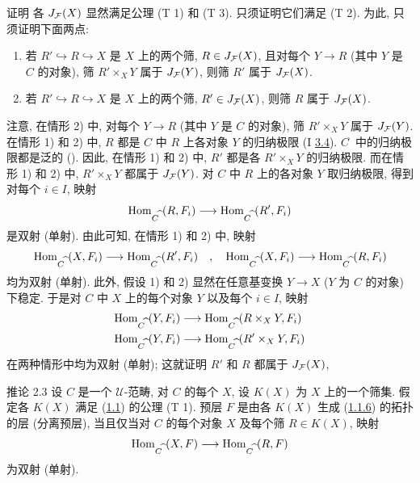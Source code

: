 \begin{enonce*}[remark]{证明}
各 $J_{{\mathcal F}}(X)$ 显然满足公理 (T 1) 和 (T 3).
只须证明它们满足 (T 2). 为此, 只须证明下面两点:
\begin{enumerate}
\renewcommand{\labelenumi}{\theenumi)}
\item 若 $R'\hookrightarrow R\hookrightarrow X$ 是 $X$ 上的两个筛,
$R\in J_{{\mathcal F}}(X)$, 且对每个 $Y\rightarrow R$
(其中 $Y$ 是 $C$ 的对象), 筛 $R'\times_X Y$ 属于 $J_{{\mathcal F}}(Y)$,
则筛 $R'$ 属于 $J_{{\mathcal F}}(X)$.

\item 若 $R'\hookrightarrow R\hookrightarrow X$ 是 $X$ 上的两个筛,
$R'\in J_{{\mathcal F}}(X)$, 则筛 $R$ 属于 $J_{{\mathcal F}}(X)$.
\end{enumerate}
\end{enonce*}

注意, 在情形 2) 中, 对每个 $Y\rightarrow R$
(其中 $Y$ 是 $C$ 的对象), 筛 $R'\times_X Y$ 属于 $J_{{\mathcal F}}(Y)$.
在情形 1) 和 2) 中, $R$ 都是 $C$ 中 $R$ 上各对象 $Y$ 的归纳极限
(I \hyperref[I.prop3.4]{3.4}).
$C^{\widehat{\phantom{,}}}$ 中的\pageoriginale{}归纳极限都是泛的
().
因此, 在情形 1) 和 2) 中, $R'$ 都是各 $R'\times_X Y$ 的归纳极限.
而在情形 1) 和 2) 中, $R'\times_X Y$ 都属于 $J_{{\mathcal F}}(Y)$.
对 $C$ 中 $R$ 上的各对象 $Y$ 取归纳极限, 得到对每个 $i\in I$, 映射
$$
\operatorname{Hom}_{C^{\widehat{\phantom{,}}}}(R,F_i)\longrightarrow
\operatorname{Hom}_{C^{\widehat{\phantom{,}}}}(R',F_i)
$$
是双射 (\resp 单射).
由此可知, 在情形 1) 和 2) 中, 映射
$$
\operatorname{Hom}_{C^{\widehat{\phantom{,}}}}(X,F_i)\longrightarrow
\operatorname{Hom}_{C^{\widehat{\phantom{,}}}}(R',F_i)\quad,\quad
\operatorname{Hom}_{C^{\widehat{\phantom{,}}}}(X,F_i)\longrightarrow
\operatorname{Hom}_{C^{\widehat{\phantom{,}}}}(R,F_i)
$$
均为双射 (\resp 单射).
此外, 假设 1) 和 2) 显然在任意基变换 $Y\rightarrow X$
($Y$ 为 $C$ 的对象) 下稳定.
于是对 $C$ 中 $X$ 上的每个对象 $Y$ 以及每个 $i\in I$, 映射
\begin{align*}
\operatorname{Hom}_{C^{\widehat{\phantom{,}}}}(Y,F_i)&\longrightarrow
\operatorname{Hom}_{C^{\widehat{\phantom{,}}}}(R\times_X Y, F_i)\\
\operatorname{Hom}_{C^{\widehat{\phantom{,}}}}(Y,F_i)&\longrightarrow
\operatorname{Hom}_{C^{\widehat{\phantom{,}}}}(R'\times_X Y, F_i)
\end{align*}
在两种情形中均为双射 (\resp 单射);
这就证明 $R'$ 和 $R$ 都属于 $J_{{\mathcal F}}(X)$, \cqfd

\begin{enonce*}{推论 2.3}
设 $C$ 是一个 $𝒰$-范畴,
对 $C$ 的每个 $X$, 设 $K(X)$ 为 $X$ 上的一个筛集.
假定各 $K(X)$ 满足 {\rm(\hyperref[II.def1.1]{1.1})} 的公理 {\rm (T 1)}.
预层 $F$ 是由各 $K(X)$ 生成
(\hyperref[II.subsubsec1.1.6]{1.1.6}) 的拓扑的层
(\resp 分离预层), 当且仅当对 $C$ 的每个对象 $X$
及每个筛 $R\in K(X)$, 映射
$$
\operatorname{Hom}_{C^{\widehat{\phantom{,}}}}(X,F)\longrightarrow
\operatorname{Hom}_{C^{\widehat{\phantom{,}}}}(R,F)
$$
为双射 (\resp 单射).
\end{enonce*}

